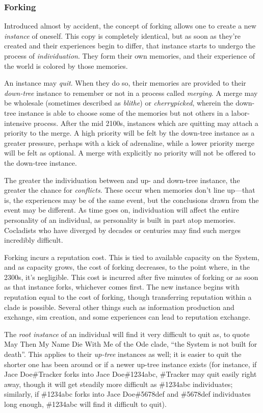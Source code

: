 \subsubsection{Forking}

Introduced almost by accident, the concept of forking allows one to create a new \emph{instance} of oneself. This copy is completely identical, but as soon as they're created and their experiences begin to differ, that instance starts to undergo the process of \emph{individuation}. They form their own memories, and their experience of the world is colored by those memories.

An instance may \emph{quit}. When they do so, their memories are provided to their \emph{down-tree} instance to remember or not in a process called \emph{merging}. A merge may be wholesale (sometimes described as \emph{blithe}) or \emph{cherrypicked}, wherein the down-tree instance is able to choose some of the memories but not others in a labor-intensive process. After the mid 2100s, instances which are quitting may attach a priority to the merge. A high priority will be felt by the down-tree instance as a greater pressure, perhaps with a kick of adrenaline, while a lower priority merge will be felt as optional. A merge with explicitly no priority will not be offered to the down-tree instance.

The greater the individuation between and up- and down-tree instance, the greater the chance for \emph{conflicts}. These occur when memories don't line up---that is, the experiences may be of the same event, but the conclusions drawn from the event may be different. As time goes on, individuation will affect the entire personality of an individual, as personality is built in part atop memories. Cocladists who have diverged by decades or centuries may find such merges incredibly difficult.

Forking incurs a reputation cost. This is tied to available capacity on the System, and as capacity grows, the cost of forking decreases, to the point where, in the 2300s, it's negligible. This cost is incurred after five minutes of forking or as soon as that instance forks, whichever comes first. The new instance begins with reputation equal to the cost of forking, though transferring reputation within a clade is possible. Several other things such as information production and exchange, sim creation, and some experiences can lead to reputation exchange.

The \emph{root instance} of an individual will find it very difficult to quit as, to quote May Then My Name Die With Me of the Ode clade, ``the System is not built for death''. This applies to their \emph{up-tree} instances as well; it is easier to quit the shorter one has been around or if a newer up-tree instance exists (for instance, if Jace Doe\#Tracker forks into Jace Doe\#1234abc, \#Tracker may quit easily right away, though it will get steadily more difficult as \#1234abc individuates; similarly, if \#1234abc forks into Jace Doe\#5678def and \#5678def individuates long enough, \#1234abc will find it difficult to quit).

